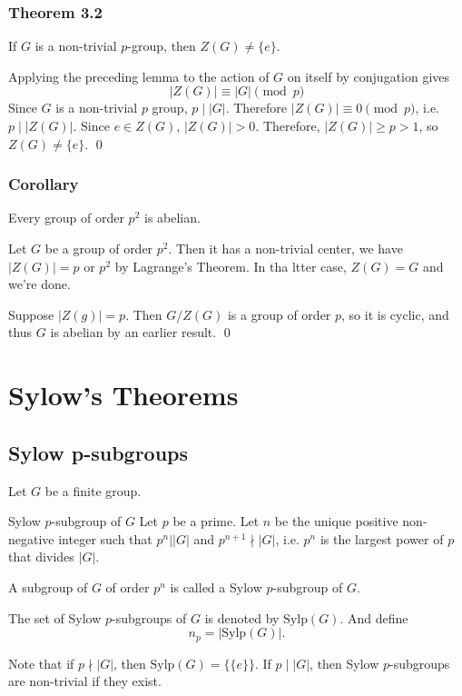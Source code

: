 \documentclass{article}
\renewenvironment{proof}{{\bfseries\color{blue1} Proof:}}{\qed}
\begin{document}
\subsubsection{Theorem 3.2}
\begin{idea}
    If $G$ is a non-trivial $p$-group, then $Z(G) \neq \{e\}$.
\end{idea}
\begin{proof}
    Applying the preceding lemma to the action of $G$ on itself by conjugation gives
    \begin{equation*}
        |Z(G)| \equiv |G| \pmod{p}
    \end{equation*}
    Since $G$ is a non-trivial $p$ group, $p \mid |G|$. Therefore $|Z(G)|\equiv 0 \pmod{p}$, i.e. $p \mid |Z(G)|$. Since $e\in Z(G)$, $|Z(G)|>0$. Therefore, $|Z(G)|\ge p > 1$, so $Z(G) \neq \{e\}$.
\end{proof}
\subsubsection{Corollary}
\begin{idea}
    Every group of order $p^2$ is abelian.
\end{idea}
\begin{proof}
    Let $G$ be a group of order $p^2$. Then it has a non-trivial center, we have $|Z(G)|=p\text{ or }p^2$ by Lagrange's Theorem. In tha ltter case, $Z(G)=G$ and we're done.

    Suppose $|Z(g)|=p$. Then $G/Z(G)$ is a group of order $p$, so it is cyclic, and thus $G$ is abelian by an earlier result.
\end{proof}
\newpage
\section{Sylow's Theorems}
\subsection{Sylow p-subgroups}
Let $G$ be a finite group.
\begin{definition}{Sylow $p$-subgroup of $G$}
    Let $p$ be a prime. Let $n$ be the unique positive non-negative integer such that $p^n \bigg| |G|$ and $p^{n+1}\nmid |G|$, i.e. $p^n$ is the largest power of $p$ that divides $|G|$.
    \vspace{2mm}

    A subgroup of $G$ of order $p^n$ is called a Sylow $p$-subgroup of $G$.
    \vspace{2mm}

    The set of Sylow $p$-subgroups of $G$ is denoted by $\text{Sylp}(G)$. And define
    \begin{equation*}
        n_p = |\text{Sylp}(G)|.
    \end{equation*}
\end{definition}
Note that if $p \nmid |G|$, then $\text{Sylp}(G) = \{\{e\}\}$. If $p \mid |G|$, then Sylow $p$-subgroups are non-trivial if they exist.
\end{document}
